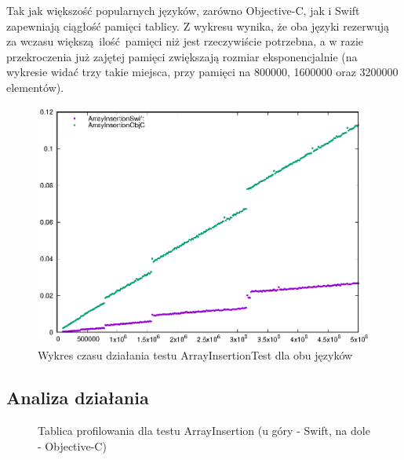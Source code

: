 \documentclass[mgr, shortabstract]{iithesis}
\begin{document}
Tak jak większość popularnych języków, zarówno Objective-C, jak i Swift zapewniają ciągłość pamięci tablicy. Z wykresu wynika, że oba języki rezerwują za wczasu większą ilość pamięci niż jest rzeczywiście potrzebna, a w razie przekroczenia już zajętej pamięci zwiększają rozmiar eksponencjalnie (na wykresie widać trzy takie miejsca, przy pamięci na 800000, 1600000 oraz 3200000 elementów).

\begin{figure}
    \includegraphics{plots/ArrayInsertion.eps}
    \caption{Wykres czasu działania testu ArrayInsertionTest dla obu języków}
    \label{p:array_insertion}
\end{figure}

\subsection{Analiza działania}

\begin{figure}
    \caption{Tablica profilowania dla testu ArrayInsertion (u góry - Swift, na dole - Objective-C)}
    \label{i:array_insertion}
\end{figure}
\end{document}
